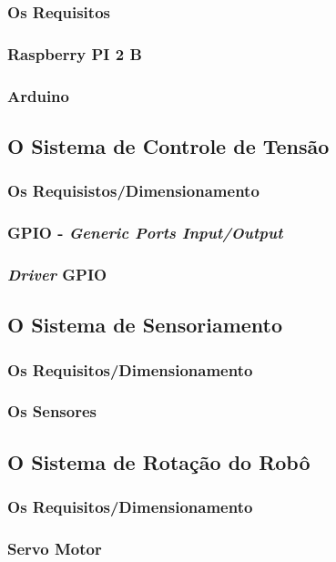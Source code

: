       \subsubsection{Os Requisitos}
      \subsubsection{Raspberry PI 2 B}
      \subsubsection{Arduino}
    \subsection{O Sistema de Controle de Tensão}
      \subsubsection{Os Requisistos/Dimensionamento}
      \subsubsection{GPIO - \textit{Generic Ports Input/Output}}
      \subsubsection{\textit{Driver} GPIO}
    \subsection{O Sistema de Sensoriamento}
      \subsubsection{Os Requisitos/Dimensionamento}
      \subsubsection{Os Sensores}
    \subsection{O Sistema de Rotação do Robô}
      \subsubsection{Os Requisitos/Dimensionamento}
      \subsubsection{Servo Motor}
